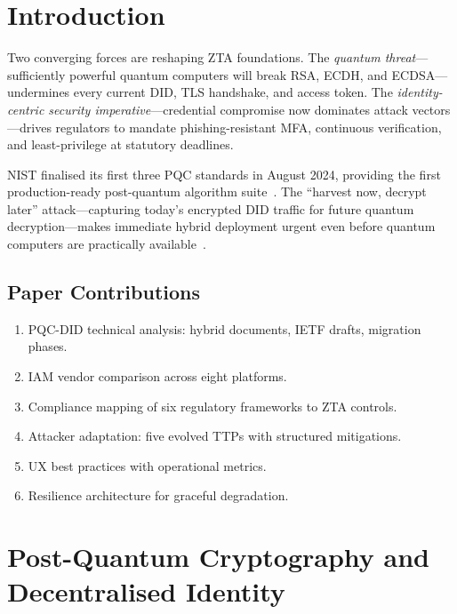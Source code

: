 \documentclass[sigconf,nonacm]{acmart}
\begin{document}
\section{Introduction}

Two converging forces are reshaping ZTA foundations.  The
\emph{quantum threat}---sufficiently powerful quantum computers will
break RSA, ECDH, and ECDSA---undermines every current DID, TLS
handshake, and access token.  The \emph{identity-centric security
imperative}---credential compromise now dominates attack
vectors---drives regulators to mandate phishing-resistant MFA,
continuous verification, and least-privilege at statutory deadlines.

NIST finalised its first three PQC standards in August 2024, providing
the first production-ready post-quantum algorithm suite~\cite{nist204}.
The ``harvest now, decrypt later'' attack---capturing today's encrypted
DID traffic for future quantum decryption---makes immediate hybrid
deployment urgent even before quantum computers are practically
available~\cite{linkedin2024}.

\subsection*{Paper Contributions}
\begin{enumerate}[leftmargin=*, label=(\arabic*), topsep=2pt, itemsep=1pt]
  \item PQC-DID technical analysis: hybrid documents, IETF drafts, migration phases.
  \item IAM vendor comparison across eight platforms.
  \item Compliance mapping of six regulatory frameworks to ZTA controls.
  \item Attacker adaptation: five evolved TTPs with structured mitigations.
  \item UX best practices with operational metrics.
  \item Resilience architecture for graceful degradation.
\end{enumerate}

\section{Post-Quantum Cryptography and Decentralised Identity}
\end{document}

